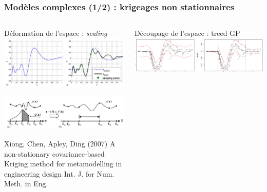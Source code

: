 \begin{frame}
\frametitle{Modèles complexes (1/2) : krigeages non stationnaires}
\vspace{-8mm}
\begin{columns}[t]
 \begin{column}{.49\textwidth}
 \begin{block}{Déformation de l'espace : \textit{scaling}} 
 \includegraphics[trim= 0mm 0mm 0mm 0mm, clip, width=\textwidth]{fig/nonSTkrig1.png}
 
 \includegraphics[trim= 0mm 0mm 0mm 0mm, clip, width=\textwidth]{fig/nonSTkrig2.png}

 \scriptsize{
 \begin{thebibliography}{1}
\beamertemplatearticlebibitems
 Xiong, Chen, Apley, Ding (2007)
\newblock A non-stationary covariance-based Kriging method for metamodelling in engineering design
\newblock Int. J. for Num. Meth. in Eng.
\end{thebibliography}
}
 \end{block}
 \end{column}
 \begin{column}{.49\textwidth}
  \begin{block}{Découpage de l'espace : treed GP}
\centering
   \includegraphics[trim= 0mm 0mm 225mm 0mm, clip, width=.85\textwidth]{fig/tgp.png}
 

\end{block}
\end{column}
\end{columns}
\end{frame}
